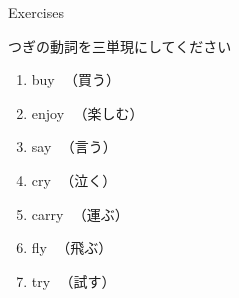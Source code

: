 \documentclass[aspectratio=169,xcolor={dvipsnames,table}]{beamer}
\begin{document}
\begin{frame}[plain]{Exercises}
 
つぎの動詞を三単現にしてください

\Large
\begin{enumerate}
 \item buy\,\,\,\,{\small {}（買う）}\hfill{}\hspace{200pt}\mbox{}
 \item enjoy\,\,\,\,{\small {}（楽しむ）}\hfill{}\hspace{200pt}\mbox{}
 \item say\,\,\,\,{\small {}（言う）}\hfill{}\hspace{160pt}\mbox{}
 \item cry\,\,\,\,{\small {}（泣く）}\hfill{}\hspace{200pt}\mbox{}
 \item carry\,\,\,\,{\small {}（運ぶ）}\hfill{}\hspace{200pt}\mbox{}
 \item fly\,\,\,\,{\small {}（飛ぶ）}\hfill{}\hspace{200pt}\mbox{}
 \item try\,\,\,\,{\small {}（試す）}\hfill{}\hspace{200pt}\mbox{}
\end{enumerate}



\end{frame}
\end{document}
